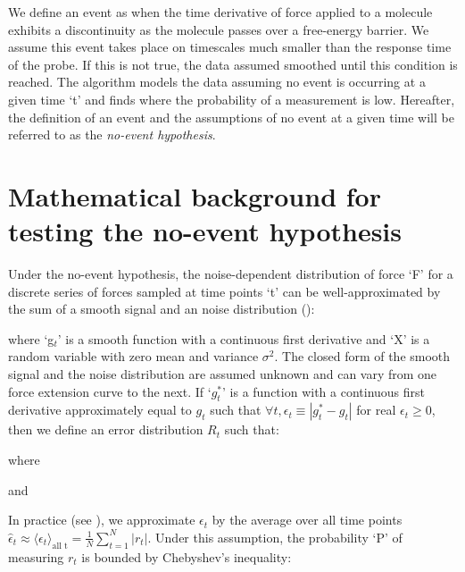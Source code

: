 \firstp We define an event as when the time derivative of force applied to a molecule exhibits a discontinuity as the molecule passes over a free-energy barrier. We assume this event takes place on timescales much smaller than the response time of the probe. If this is not true, the data assumed smoothed until this condition is reached. The algorithm models the data assuming no event is occurring at a given time `t' and finds where the probability of a measurement is low. Hereafter, the definition of an event and the assumptions of no event at a given time will be referred to as the \emph{no-event hypothesis}. 

\section{Mathematical background for testing the no-event hypothesis}

\firstp Under the no-event hypothesis, the noise-dependent distribution of force `F' for a discrete series of forces sampled at time points `t' can be well-approximated by the sum of a smooth signal and an noise distribution ():


where `g$_t$' is a smooth function with a continuous first derivative and `X' is a random variable with zero mean and variance $\sigma^2$. The closed form of the smooth signal and the noise distribution are assumed unknown and can vary from one force extension curve to the next. If `$g^{*}_t$' is a function with a continuous first derivative approximately equal to $g_t$ such that $\forall t,\epsilon_t\equiv|g^{*}_t-g_t|$ for real $\epsilon_t\ge 0$, then we define an error distribution $R_t$ such that: \pl


where


and 


In practice (see ), we approximate $\epsilon_t$ by the average over all time points $\hat{\epsilon}_t \approx \langle \epsilon_t \rangle_{\text{all t}} = \frac{1}{N} \sum_{t=1}^N |r_t|$. Under this assumption, the probability `P' of measuring $r_t$ is bounded by Chebyshev's inequality:

